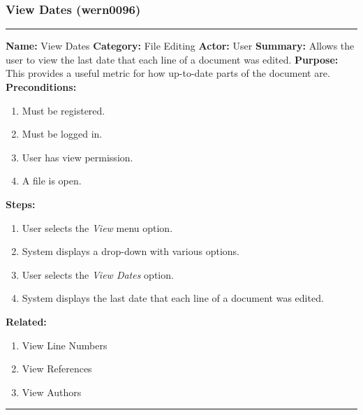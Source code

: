 \documentclass[11pt]{report}
\begin{document}
\subsubsection{View Dates (wern0096)}
\vspace{2pt}
\hrule
\vspace{8pt}
	\noindent\textbf{Name:} View Dates \newline
	\textbf{Category:} File Editing \newline
	\textbf{Actor:} User \newline
	\textbf{Summary:} Allows the user to view the last date that each line of a document was edited. \newline
	\textbf{Purpose:} This provides a useful metric for how up-to-date parts of the document are. \newline
	\textbf{Preconditions:}
	\begin{enumerate}
		\item Must be registered.
		\item Must be logged in.
		\item User has view permission.
		\item A file is open.
	\end{enumerate}
	\textbf{Steps:}
	\begin{enumerate}
		\item User selects the \textit{View} menu option.
		\item System displays a drop-down with various options.
		\item User selects the \textit{View Dates} option.
		\item System displays the last date that each line of a document was edited.
	\end{enumerate}
	\textbf{Related:}
	\begin{enumerate}
		\item View Line Numbers
		\item View References
		\item View Authors
	\end{enumerate}
\vspace{8pt}
\hrule
\newpage
\end{document}
